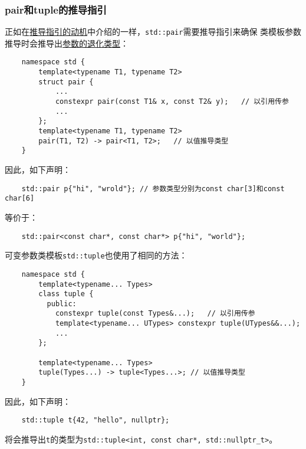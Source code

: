 \subsubsection{pair和tuple的推导指引}
正如在\hyperref[ch9.1.4]{推导指引的动机}中介绍的一样，\texttt{std::pair}需要推导指引来确保
类模板参数推导时会推导出\hyperref[ch9.2.1]{参数的退化类型}：
\begin{lstlisting}
    namespace std {
        template<typename T1, typename T2>
        struct pair {
            ...
            constexpr pair(const T1& x, const T2& y);   // 以引用传参
            ...
        };
        template<typename T1, typename T2>
        pair(T1, T2) -> pair<T1, T2>;   // 以值推导类型
    }
\end{lstlisting}
因此，如下声明：
\begin{lstlisting}
    std::pair p{"hi", "wrold"}; // 参数类型分别为const char[3]和const char[6]
\end{lstlisting}
等价于：
\begin{lstlisting}
    std::pair<const char*, const char*> p{"hi", "world"};
\end{lstlisting}
可变参数类模板\texttt{std::tuple}也使用了相同的方法：
\begin{lstlisting}
    namespace std {
        template<typename... Types>
        class tuple {
          public:
            constexpr tuple(const Types&...);   // 以引用传参
            template<typename... UTypes> constexpr tuple(UTypes&&...);
            ...
        };

        template<typename... Types>
        tuple(Types...) -> tuple<Types...>; // 以值推导类型
    }
\end{lstlisting}
因此，如下声明：
\begin{lstlisting}
    std::tuple t{42, "hello", nullptr};
\end{lstlisting}
将会推导出\texttt{t}的类型为\texttt{std::tuple<int, const char*, std::nullptr\_t>}。

